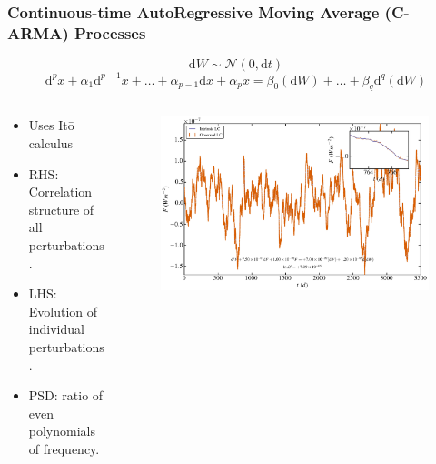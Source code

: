 \documentclass[hyperref={pdfpagelabels=false}]{beamer}
\begin{document}
\begin{frame}
\frametitle{Continuous-time AutoRegressive Moving Average (C-ARMA) Processes}
  \begin{equation*} \mathrm{d}W \sim \mathcal{N}(0,\mathrm{d}t) \end{equation*}
  \begin{equation*}\label{eq:CARMA} \mathrm{d}^{p}x + \alpha_{1} \mathrm{d}^{p-1}x + \ldots + \alpha_{p-1} \mathrm{d}x + \alpha_{p}x = \beta_{0} (\mathrm{d}W) + \ldots + \beta_{q} \mathrm{d}^{q}(\mathrm{d}W) \end{equation*}
  \begin{columns}
    \centering
    \begin{column}{0.5\textwidth}
      \begin{itemize}
        \item Uses It\={o} calculus {\tiny \citet{Davis,Brockwell14,Kelly14}}
        \item RHS: Correlation structure of all perturbations.
        \item LHS: Evolution of individual perturbations.
        \item PSD: ratio of even polynomials of frequency.
      \end{itemize}
    \end{column}
    \begin{column}{0.5\textwidth}
      \begin{figure}
        \includegraphics[scale=0.0425]{images/CARMA(2,1)_LC.jpg}
      \end{figure}
    \end{column}
  \end{columns}
\end{frame}
\end{document}
